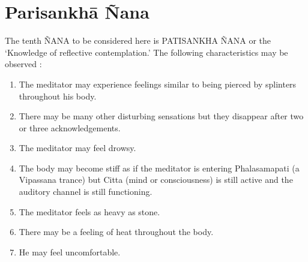 \documentclass[a5paper,10pt,english]{book}
\begin{document}
\section{Parisankhā Ñana}
\label{\detokenize{progress:parisankha-nana}}
\sphinxAtStartPar
The tenth ÑANA to be considered here is PATISANKHA ÑANA or the ‘Knowledge of reflective contemplation.’ The following characteristics may be observed :\sphinxhyphen{}
\begin{enumerate}
%
\item {} 
\sphinxAtStartPar
The meditator may experience feelings similar to being pierced by splinters throughout his body.

\item {} 
\sphinxAtStartPar
There may be many other disturbing sensations but they disappear after two or three acknowledgements.

\item {} 
\sphinxAtStartPar
The meditator may feel drowsy.

\item {} 
\sphinxAtStartPar
The body may become stiff as if the meditator is entering Phalasamapati (a Vipassana trance) but Citta (mind or consciousness) is still active and the auditory channel is still functioning.

\item {} 
\sphinxAtStartPar
The meditator feels as heavy as stone.

\item {} 
\sphinxAtStartPar
There may be a feeling of heat throughout the body.

\item {} 
\sphinxAtStartPar
He may feel uncomfortable.

\end{enumerate}
\end{document}
